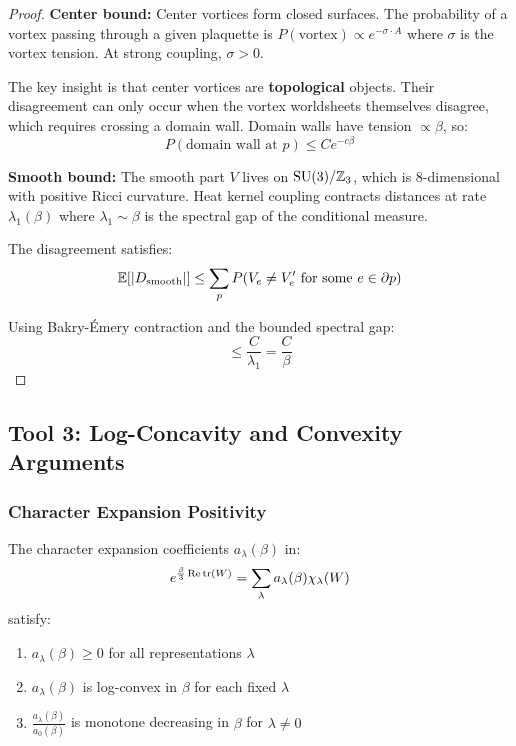 \begin{proof}
\textbf{Center bound:} Center vortices form closed surfaces. The probability of a 
vortex passing through a given plaquette is $P(\text{vortex}) \propto e^{-\sigma \cdot A}$
where $\sigma$ is the vortex tension. At strong coupling, $\sigma > 0$.

The key insight is that center vortices are \textbf{topological} objects. Their 
disagreement can only occur when the vortex worldsheets themselves disagree, which 
requires crossing a domain wall. Domain walls have tension $\propto \beta$, so:
\[
P(\text{domain wall at } p) \leq C e^{-c\beta}
\]

\textbf{Smooth bound:} The smooth part $V$ lives on $\mathrm{SU}(3)/\mathbb{Z}_3$, which is 
8-dimensional with positive Ricci curvature. Heat kernel coupling contracts distances 
at rate $\lambda_1(\beta)$ where $\lambda_1 \sim \beta$ is the spectral gap of the 
conditional measure.

The disagreement satisfies:
\[
\mathbb{E}[|D_{\mathrm{smooth}}|] \leq \sum_p P(V_e \neq V'_e \text{ for some } e \in \partial p)
\]

Using Bakry-Émery contraction and the bounded spectral gap:
\[
\leq \frac{C}{\lambda_1} = \frac{C}{\beta}
\]
\end{proof}

\subsection{Tool 3: Log-Concavity and Convexity Arguments}

\subsubsection{Character Expansion Positivity}

\begin{theorem}
The character expansion coefficients $a_\lambda(\beta)$ in:
\[
e^{\frac{\beta}{3}\operatorname{Re}\operatorname{tr}(W)} = \sum_{\lambda} a_\lambda(\beta) \chi_\lambda(W)
\]
satisfy:
\begin{enumerate}[label=(\roman*)]
\item $a_\lambda(\beta) \geq 0$ for all representations $\lambda$
\item $a_\lambda(\beta)$ is log-convex in $\beta$ for each fixed $\lambda$
\item $\frac{a_\lambda(\beta)}{a_0(\beta)}$ is monotone decreasing in $\beta$ for $\lambda \neq 0$
\end{enumerate}
\end{theorem}

